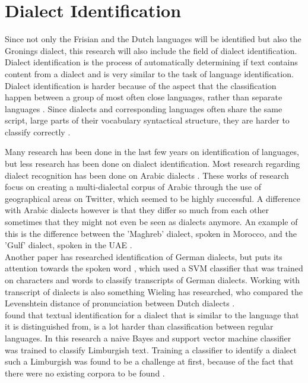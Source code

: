\documentclass[
10pt, %
a4paper, %
oneside, %
headinclude,footinclude, %
] {book}%
\begin{document}
\section{Dialect Identification}

Since not only the Frisian and the Dutch languages will be identified but also the Gronings dialect, this research will also include the field of dialect identification.  Dialect identification is the process of automatically determining if text contains content from a dialect and is very similar to the task of language identification. Dialect identification is harder because of the aspect that the classification happen between a group of most often close languages, rather than separate languages \citep{zaidan}. Since dialects and corresponding languages often share the same script, large parts of their vocabulary syntactical structure, they are harder to classify correctly \citep{zaidan}.

Many research has been done in the last few years on identification of languages, but less research has been done on dialect identification. Most research regarding dialect recognition has been done on Arabic dialects\citep{arabic1} \citep{arabic2}. These works of research focus on creating a multi-dialectal corpus of Arabic through the use of geographical areas on Twitter, which seemed to be highly successful. A difference with Arabic dialects however is that they differ so much from each other sometimes that they might not even be seen as dialects anymore. An example of this is the difference between the 'Maghreb' dialect, spoken in Morocco, and the 'Gulf' dialect, spoken in the UAE \citep{arabic1}. \\
Another paper has researched identification of German dialects, but puts its attention towards the spoken word \citep{ciobanu-etal-2018-german}, which used a SVM classifier that was trained on characters and words to classify transcripts of German dialects.  Working with transcript of dialects is also something Wieling has researched, who compared the Levenshtein distance of pronunciation between Dutch dialects \citep{8d03acecd9a548408debaebdb5c528b6}. \\
\citep{limburg} found that textual identification for a dialect that is similar to the language that it is distinguished from, is a lot harder than classification between regular languages. In this research a naive Bayes and support vector machine classifier was trained to classify Limburgish text. Training a classifier to identify a dialect such a Limburgish was found to be a challenge at first, because of the fact that there were no existing corpora to be found \citep{limburg}. 
\end{document}
